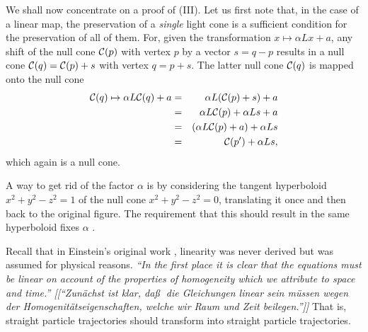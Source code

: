 
We shall now concentrate on a proof of (III).
Let us first note that, in the case of a linear map, the preservation of a {\em single}
light cone is a sufficient condition for the preservation of all of them.
For, given the transformation
$x\mapsto \alpha Lx +a$, any shift of the null cone ${\cal C}(p)$ with vertex $p$
by a vector $s=q-p$ results in a null cone ${\cal C}(q)={\cal C}(p)+s$ with vertex $q=p+s$.
The latter null cone ${\cal C}(q)$ is mapped onto the null cone
\begin{eqnarray}
{\cal C}(q)\mapsto \alpha L{\cal C}(q) +a
&=& \alpha L ({\cal C}(p)+s)+a\nonumber \\
&=& \alpha L {\cal C}(p)+\alpha L s+a\nonumber \\
&=& (\alpha L {\cal C}(p)+a)+\alpha L s\nonumber \\
&=&  {\cal C}(p')+\alpha L s,\nonumber
\end{eqnarray}
which again is a null cone.


A way to get rid of the factor $\alpha$ is by considering the tangent hyperboloid
$x^2+y^2-z^2=1$ of the null cone $x^2+y^2-z^2=0$, translating it once and then back
to the original figure. The requirement that this should result in the same hyperboloid
fixes $\alpha$
\cite{havlicek-priv}.

Recall that in Einstein's original work \cite[par 3]{ein-05},
linearity was never derived but was assumed for physical reasons.
{\em ``In the first place it is clear that the equations must
be {\em linear} on account of the properties of homogeneity which we attribute to space and time.''
[[``Zun\"achst ist klar, da\ss$\;$ die Gleichungen {\em linear} sein m\"ussen
wegen der Homogenit\"atseigenschaften, welche wir Raum und Zeit beilegen.'']]}
That is, straight particle trajectories should transform into straight particle trajectories.

